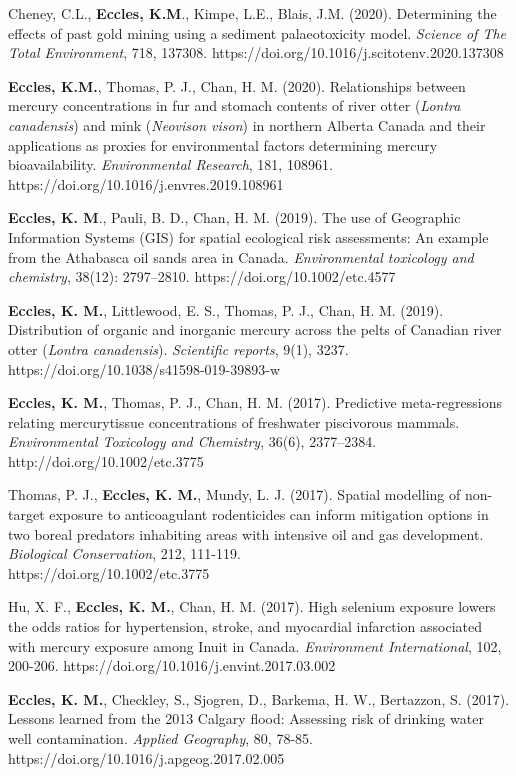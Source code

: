 \documentclass[margin,line]{res}
\begin{document}
\begin{resume}
Cheney, C.L., \textbf{Eccles, K.M}., Kimpe, L.E., Blais, J.M. (2020). Determining the effects of past gold mining using a sediment palaeotoxicity model. \textit{Science of The Total Environment}, 718, 137308. https://doi.org/10.1016/j.scitotenv.2020.137308

\textbf{Eccles, K.M.}, Thomas, P. J., Chan, H. M. (2020). Relationships between mercury concentrations in fur and stomach contents of river otter (\textit{Lontra canadensis}) and mink (\textit{Neovison vison}) in northern Alberta Canada and their applications as proxies for environmental factors determining mercury bioavailability. \textit{Environmental Research}, 181, 108961. https://doi.org/10.1016/j.envres.2019.108961

\textbf{Eccles, K. M}., Pauli, B. D., Chan, H. M. (2019). The use of Geographic Information Systems (GIS) for spatial ecological risk assessments: An example from the Athabasca oil sands area in Canada. \textit{Environmental toxicology and chemistry}, 38(12): 2797–2810. https://doi.org/10.1002/etc.4577

\textbf{Eccles, K. M.}, Littlewood, E. S., Thomas, P. J., Chan, H. M. (2019). Distribution of organic and inorganic mercury across the pelts of Canadian river otter (\textit{Lontra canadensis}). \textit{Scientific reports}, 9(1), 3237. https://doi.org/10.1038/s41598-019-39893-w

\textbf{Eccles, K. M.}, Thomas, P. J., Chan, H. M. (2017). Predictive meta-regressions relating mercurytissue concentrations of freshwater piscivorous mammals. \textit{Environmental Toxicology and Chemistry}, 36(6), 2377–2384. http://doi.org/10.1002/etc.3775

Thomas, P. J., \textbf{Eccles, K. M.}, Mundy, L. J. (2017). Spatial modelling of non-target exposure to anticoagulant rodenticides can inform mitigation options in two boreal predators inhabiting areas with intensive oil and gas development. \textit{Biological Conservation}, 212, 111-119. \\https://doi.org/10.1002/etc.3775

Hu, X. F., \textbf{Eccles, K. M.}, Chan, H. M. (2017). High selenium exposure lowers the odds ratios for hypertension, stroke, and myocardial infarction associated with mercury exposure among Inuit in Canada. \textit{Environment International}, 102, 200-206. https://doi.org/10.1016/j.envint.2017.03.002

\textbf{Eccles, K. M.}, Checkley, S., Sjogren, D., Barkema, H. W., Bertazzon, S. (2017). Lessons learned from the 2013 Calgary flood: Assessing risk of drinking water well contamination. \textit{Applied Geography}, 80, 78-85. https://doi.org/10.1016/j.apgeog.2017.02.005


\end{resume}
\end{document}
